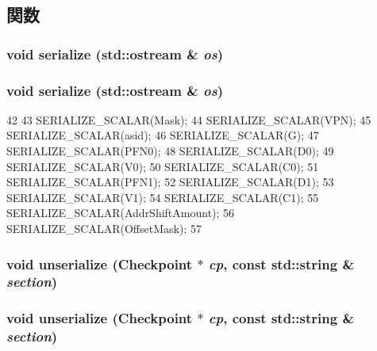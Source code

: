 \subsection{関数}
\hypertarget{structMipsISA_1_1PTE_a53e036786d17361be4c7320d39c99b84}{
\subsubsection[{serialize}]{\setlength{\rightskip}{0pt plus 5cm}void serialize (std::ostream \& {\em os})}}
\label{structMipsISA_1_1PTE_a53e036786d17361be4c7320d39c99b84}
\hypertarget{structMipsISA_1_1PTE_a53e036786d17361be4c7320d39c99b84}{
\subsubsection[{serialize}]{\setlength{\rightskip}{0pt plus 5cm}void serialize (std::ostream \& {\em os})}}
\label{structMipsISA_1_1PTE_a53e036786d17361be4c7320d39c99b84}



\begin{DoxyCode}
42 {
43     SERIALIZE_SCALAR(Mask);
44     SERIALIZE_SCALAR(VPN);
45     SERIALIZE_SCALAR(asid);
46     SERIALIZE_SCALAR(G);
47     SERIALIZE_SCALAR(PFN0);
48     SERIALIZE_SCALAR(D0);
49     SERIALIZE_SCALAR(V0);
50     SERIALIZE_SCALAR(C0);
51     SERIALIZE_SCALAR(PFN1);
52     SERIALIZE_SCALAR(D1);
53     SERIALIZE_SCALAR(V1);
54     SERIALIZE_SCALAR(C1);
55     SERIALIZE_SCALAR(AddrShiftAmount);
56     SERIALIZE_SCALAR(OffsetMask);
57 }
\end{DoxyCode}
\hypertarget{structMipsISA_1_1PTE_af22e5d6d660b97db37003ac61ac4ee49}{
\subsubsection[{unserialize}]{\setlength{\rightskip}{0pt plus 5cm}void unserialize ({\bf Checkpoint} $\ast$ {\em cp}, \/  const std::string \& {\em section})}}
\label{structMipsISA_1_1PTE_af22e5d6d660b97db37003ac61ac4ee49}
\hypertarget{structMipsISA_1_1PTE_af22e5d6d660b97db37003ac61ac4ee49}{
\subsubsection[{unserialize}]{\setlength{\rightskip}{0pt plus 5cm}void unserialize ({\bf Checkpoint} $\ast$ {\em cp}, \/  const std::string \& {\em section})}}
\label{structMipsISA_1_1PTE_af22e5d6d660b97db37003ac61ac4ee49}



